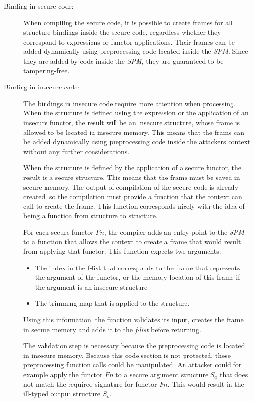 \documentclass[10pt,a4paper,master=cws, masteroption=ai,english,inputenc=utf8]{kulemt}
\begin{document}
\begin{description}
\item[Binding in secure code:] When compiling the secure code, it is possible to create frames for all structure bindings inside the secure code, regardless whether they correspond to  expressions or functor applications.
Their frames can be added dynamically using preprocessing code located inside the \emph{SPM}. 
Since they are added by code inside the \emph{SPM}, they are guaranteed to be tampering-free.
\item[Binding in insecure code:] The bindings in insecure code require more attention when processing.
When the structure is defined using the  expression or the application of an insecure functor, the result will be an insecure structure, whose frame is allowed to be located in insecure memory.
This means that the frame can be added dynamically using preprocessing code inside the attackers context without any further considerations.

When the structure is defined by the application of a secure functor, the result is a secure structure.
This means that the frame must be saved in secure memory.
The output of compilation of the secure code is already created, so the compilation must provide a function that the context can call to create the frame.
This function corresponds nicely with the idea of  being a function from structure to structure.

For each secure functor $Fn$, the compiler adds an entry point to the \emph{SPM} to a function that allows the context to create a frame that would result from applying that functor.
This function expects two arguments: 
\begin{itemize}
\item The index in the f-list that corresponds to the frame that represents the argument of the functor, or the memory location of this frame if the argument is an insecure structure
\item The trimming map that is applied to the structure.
\end{itemize}
Using this information, the function validates its input, creates the frame in secure memory and adds it to the \emph{f-list} before returning.

The validation step is necessary because the preprocessing code is located in insecure memory.
Because this code section is not protected, these preprocessing function calls could be manipulated. 
An attacker could for example apply the functor $Fn$ to a secure argument structure $S_{a}$ that does not match the required signature for functor $Fn$. 
This would result in the ill-typed output structure $S_{o}$.


\end{description}
\end{document}
